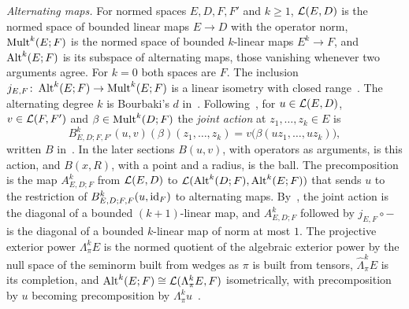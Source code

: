 \emph{Alternating maps.} For normed spaces $E,D,F,F'$ and $k\ge1$, $\mathcal L(E,D)$ is the normed space of bounded linear maps $E\to D$ with the operator norm, $\operatorname{Mult}^k(E;F)$ is the normed space of bounded $k$-linear maps $E^k\to F$, and $\operatorname{Alt}^k(E;F)$ is its subspace of alternating maps, those vanishing whenever two arguments agree. For $k=0$ both spaces are $F$. The inclusion $j_{E,F}\colon\operatorname{Alt}^k(E;F)\to\operatorname{Mult}^k(E;F)$ is a linear isometry with closed range~\cite[Section~2]{I}. The alternating degree $k$ is Bourbaki's $d$ in~\cite[n\textsuperscript{o}~7.8]{Bou}. Following~\cite[Section~2]{I}, for $u\in\mathcal L(E,D)$, $v\in\mathcal L(F,F')$ and $\beta\in\operatorname{Mult}^k(D;F)$ the \emph{joint action} at $z_1,\dots,z_k\in E$ is
\[
 B^k_{E,D;F,F'}(u,v)(\beta)(z_1,\dots,z_k)=v\bigl(\beta(uz_1,\dots,uz_k)\bigr),
\]
written $B$ in~\cite{I}. In the later sections $B(u,v)$, with operators as arguments, is this action, and $B(x,R)$, with a point and a radius, is the ball. The precomposition is the map $A^k_{E,D;F}$ from $\mathcal L(E,D)$ to $\mathcal L(\operatorname{Alt}^k(D;F),\operatorname{Alt}^k(E;F))$ that sends $u$ to the restriction of $B^k_{E,D;F,F}(u,\mathrm{id}_F)$ to alternating maps. By~\cite[Proposition~2.2]{I}, the joint action is the diagonal of a bounded $(k+1)$-linear map, and $A^k_{E,D;F}$ followed by $j_{E,F}\circ{-}$ is the diagonal of a bounded $k$-linear map of norm at most $1$. The projective exterior power $\Lambda^k_\pi E$ is the normed quotient of the algebraic exterior power by the null space of the seminorm built from wedges as $\pi$ is built from tensors, $\widehat\Lambda^k_\pi E$ is its completion, and $\operatorname{Alt}^k(E;F)\cong\mathcal L(\Lambda^k_\pi E,F)$ isometrically, with precomposition by $u$ becoming precomposition by $\Lambda^k_\pi u$~\cite[Section~3.1, Proposition~3.1]{I}.

